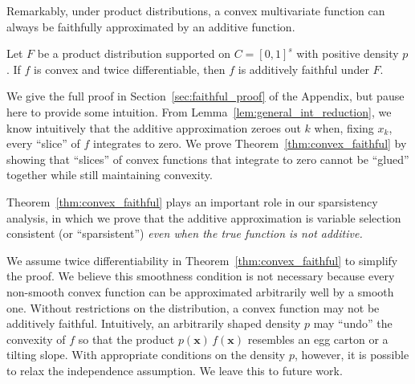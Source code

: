 Remarkably, under product distributions, a convex multivariate function can always be faithfully approximated by an additive function. 

\begin{theorem}
\label{thm:convex_faithful}
Let $F$ be a product distribution supported on $C=[0,1]^s$ with positive density $p$. If $f$ is convex and twice differentiable, then $f$ is additively faithful under $F$.
\end{theorem}

We give the full proof in Section~\ref{sec:faithful_proof} of the
Appendix, but pause here to provide some intuition. From
Lemma~\ref{lem:general_int_reduction}, we know intuitively that the
additive approximation zeroes out $k$ when, fixing $x_k$, every
``slice'' of $f$ integrates to zero. We prove
Theorem~\ref{thm:convex_faithful} by showing that ``slices'' of convex
functions that integrate to zero cannot be ``glued'' together while
still maintaining convexity.

Theorem~\ref{thm:convex_faithful} plays an important role in our
sparsistency analysis, in which we prove that the additive
approximation is variable selection consistent (or ``sparsistent'') \emph{even when the true function is not
additive.}

\begin{remark}
  We assume twice differentiability in
  Theorem~\ref{thm:convex_faithful} to simplify the proof. We believe
  this smoothness condition is not necessary because every non-smooth
  convex function can be approximated arbitrarily well by a smooth
  one.  Without restrictions on the distribution, a convex
  function may not be additively faithful. Intuitively, an arbitrarily shaped
  density $p$
  may ``undo'' the convexity of $f$ so that the product
  $p(\mathbf{x}) \, f(\mathbf{x})$ resembles an egg carton or a
  tilting slope.  With appropriate conditions on the density $p$,
  however, it is possible to relax the independence assumption.  We leave this to
  future work.
\end{remark}
